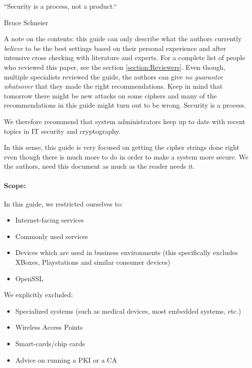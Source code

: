 \epigraph{``Security is a process, not a product.``}{Bruce Schneier}

A note on the contents: this guide can only describe what the authors currently
\emph{believe} to be the best settings based on their personal experience and
after intensive cross checking with literature and experts. For a complete list
of people who reviewed this paper, see the section \ref{section:Reviewers}.
Even though, multiple specialists reviewed the guide, the authors can give
\emph{no guarantee whatsover} that they made the right recommendations. Keep in
mind that tomorrow there might be new attacks on some ciphers and many of the
recommendations in this guide might turn out to be wrong. Security is a
process.


We therefore recommend that system administrators keep up to date with recent
topics in IT security and cryptography. 


In this sense, this guide is very focused on getting the cipher strings done
right even though there is much more to do in order to make a system more
secure.  We the authors, need this document as much as the reader needs it.

\paragraph{Scope:}
\label{section:Scope}

In this guide, we restricted ourselves to:
\begin{itemize}
\item Internet-facing services
\item Commonly used services
\item Devices which are used in business environments (this specifically excludes XBoxes, Playstations and similar consumer devices)
\item OpenSSL 
\end{itemize}

We explicitly excluded:
\begin{itemize}
\item Specialized systems (such as medical devices, most embedded systems, etc.)
\item Wireless Access Points
\item Smart-cards/chip cards
\item Advice on running a PKI or a CA
\end{itemize}

